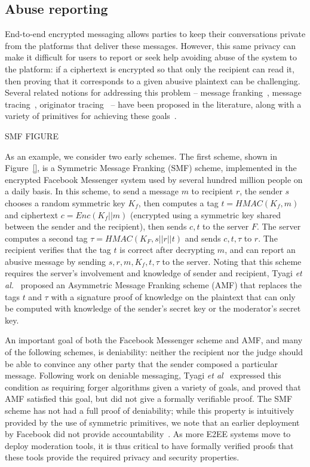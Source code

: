 \subsection{Abuse reporting} \label{sec:abuse}
End-to-end encrypted messaging allows parties to keep their conversations private from the platforms that deliver these messages.  However, this same privacy can make it difficult for users to report or seek help avoiding abuse of the system to the platform: if a ciphertext is encrypted so that only the recipient can read it, then proving that it corresponds to a given abusive plaintext can be challenging.  Several related notions for addressing this problem -- message franking~\cite{FBM,grubbs-crypto17}, message tracing~\cite{Tyagi}, originator tracing~\cite{Peale} -- have been proposed in the literature, along with a variety of primitives for achieving these goals~\cite{SMF,AMF, Tyagi, Hecate, Cerberus, Peale, ACGKA, NDSS paper, PoPETS paper,MlsGov}.

SMF FIGURE

As an example, we consider two early schemes.  The first scheme, shown in Figure~\ref{}, is a Symmetric Message Franking (SMF) scheme, implemented in the encrypted Facebook Messenger system used by several hundred million people on a daily basis.
In this scheme, to send a message $m$ to recipient $r$, the sender $s$ chooses a random symmetric key $K_f$, then computes a tag $t = HMAC(K_f,m)$ and ciphertext $c = Enc(K_f||m)$ (encrypted using a symmetric key shared between the sender and the recipient), then sends $c,t$ to the server $F$.  
The server computes a second tag $\tau = HMAC(K_F,s||r||t)$ and sends $c,t,\tau$ to $r$.  
The recipient verifies that the tag $t$ is correct after decrypting $m$, and can report an abusive message by sending $s,r,m,K_f,t,\tau$ to the server.
Noting that this scheme requires the server's involvement and knowledge of sender and recipient, Tyagi {\em et al.}~\cite{AMF} proposed an Asymmetric Message Franking scheme (AMF) that replaces the tags $t$ and $\tau$ with a signature proof of knowledge on the plaintext that can only be computed with knowledge of the sender's secret key or the moderator's secret key.

An important goal of both the Facebook Messenger scheme and AMF, and many of the following schemes, is deniability: neither the recipient nor the judge should be able to convince any other party that the sender composed a particular message.  
Following work on deniable messaging, Tyagi {\em et al}~\cite{AMF} expressed this condition as requiring forger algorithms given a variety of goals, and proved that AMF satisfied this goal, but did not give a formally verifiable proof.
The SMF scheme has not had a full proof of deniability; while this property is intuitively provided by the use of symmetric primitives, we note that an earlier deployment by Facebook did not provide accountability~\cite{}.
As more E2EE systems move to deploy moderation tools, it is thus critical to have formally verified proofs that these tools provide the required privacy and security properties.

